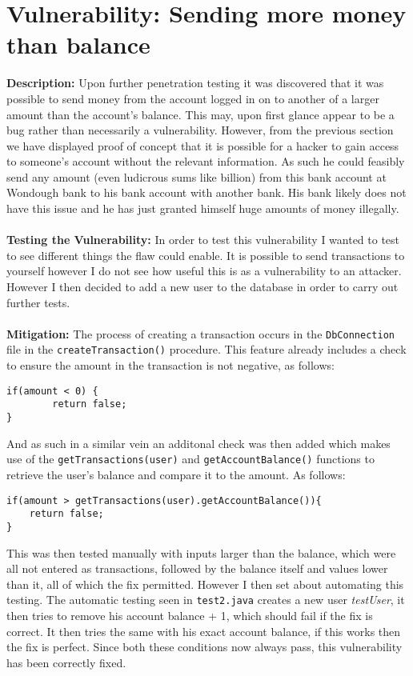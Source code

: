 \section{Vulnerability: Sending more money than balance}
\label{sec:background}
\textbf{Description:} Upon further penetration testing it was discovered that it was possible 
to send money from the account logged in on to another of a larger amount than the account's balance. This may, upon first glance appear to be a bug rather than
necessarily a vulnerability. However, from the previous section we have displayed proof of concept that it is possible for a hacker to gain access to someone's
account without the relevant information. As such he could feasibly send any amount (even ludicrous sums like  billion) from this bank account at Wondough bank
to his bank account with another bank. His bank likely does not have this issue and he has just granted himself huge amounts of money illegally. \\ \\
\textbf{Testing the Vulnerability:} In order to test this vulnerability I wanted to test to see different things the flaw could enable. It is possible to send
transactions to yourself however I do not see how useful this is as a vulnerability to an attacker. However I then decided to add a new user to the database in order
to carry out further tests. \\ \\
\textbf{Mitigation:} The process of creating a transaction occurs in the \verb|DbConnection| file in the \verb|createTransaction()| procedure. This feature already
includes a check to ensure the amount in the transaction is not negative, as follows:
\begin{verbatim}
if(amount < 0) {
        return false;
}
\end{verbatim}
And as such in a similar vein an additonal check was then added which makes use of the \verb|getTransactions(user)| and \verb|getAccountBalance()| functions to retrieve
the user's balance and compare it to the amount. As follows:
\begin{verbatim}
if(amount > getTransactions(user).getAccountBalance()){
    return false;
}
\end{verbatim}
This was then tested manually with inputs larger than the balance, which were all not entered as transactions, followed by the balance itself and values lower than it, all of
which the fix permitted. However I then set about automating this testing. The automatic testing seen in \verb|test2.java| creates a new user \textit{testUser}, it then tries
to remove his account balance + 1, which should fail if the fix is correct. It then tries the same with his exact account balance, if this works then the fix is perfect. Since
both these conditions now always pass, this vulnerability has been correctly fixed.